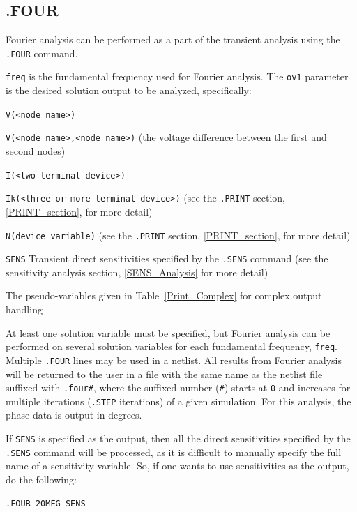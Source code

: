 {{\subsection{.FOUR}
Fourier analysis can be performed as a part of the transient analysis using
the \texttt{.FOUR} command.


\texttt{freq} is the fundamental frequency used for Fourier analysis.
The \texttt{ov1} parameter is the desired solution output to be analyzed, specifically:
\begin{XyceItemize}
\item \texttt{V(<node name>)}
\item \texttt{V(<node name>,<node name>)} (the voltage difference between the first and second nodes)
\item \texttt{I(<two-terminal device>)}
\item \texttt{Ik(<three-or-more-terminal device>)} (see the \texttt{.PRINT} section, \ref{PRINT_section}, for more detail)
\item \texttt{N(device variable)} (see the \texttt{.PRINT} section, \ref{PRINT_section}, for more detail)
\item \texttt{SENS} Transient direct sensitivities specified by the \texttt{.SENS} command  (see the sensitivity analysis section, \ref{SENS_Analysis} for more detail)
\item The pseudo-variables given in Table~\ref{Print_Complex} for complex output handling
\end{XyceItemize}
At least one solution variable must be specified, but
Fourier analysis can be performed on several solution variables for each 
fundamental frequency, \texttt{freq}.
Multiple \texttt{.FOUR} lines may be used in a netlist.  
All results from Fourier analysis will be returned to the user in a file 
with the same name as the netlist file suffixed with \texttt{.four\#}, where
the suffixed number (\texttt{\#}) starts at \texttt{0} and increases for multiple
iterations (\texttt{.STEP} iterations) of a given simulation.
For this analysis, the phase data is output in degrees.

If \texttt{SENS} is specified as the output, then all the direct sensitivities 
specified by the \texttt{.SENS} command will be processed, as it is difficult to 
manually specify the full name of a sensitivity variable.  So, if one wants 
to use sensitivities as the output, do the following:
\begin{verbatim}
.FOUR 20MEG SENS
\end{verbatim}

}}
